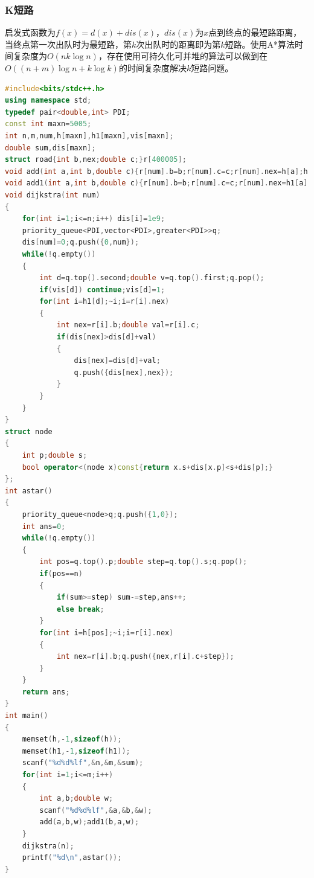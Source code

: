 \documentclass[a4paper]{book}
\begin{document}
\subsubsection{K短路}
启发式函数为$f(x)=d(x)+dis(x)$，$dis(x)$为$x$点到终点的最短路距离，当终点第一次出队时为最短路，第$k$次出队时的距离即为第$k$短路。使用A*算法时间复杂度为$O(nk\log n)$，存在使用可持久化可并堆的算法可以做到在$O((n+m) \log n + k \log k)$的时间复杂度解决$k$短路问题。
\begin{lstlisting}[language=C++]
#include<bits/stdc++.h>
using namespace std;
typedef pair<double,int> PDI;
const int maxn=5005;
int n,m,num,h[maxn],h1[maxn],vis[maxn];
double sum,dis[maxn];
struct road{int b,nex;double c;}r[400005];
void add(int a,int b,double c){r[num].b=b;r[num].c=c;r[num].nex=h[a];h[a]=num++;}
void add1(int a,int b,double c){r[num].b=b;r[num].c=c;r[num].nex=h1[a];h1[a]=num++;}
void dijkstra(int num)
{
    for(int i=1;i<=n;i++) dis[i]=1e9;
    priority_queue<PDI,vector<PDI>,greater<PDI>>q;
    dis[num]=0;q.push({0,num});
    while(!q.empty())
    {
        int d=q.top().second;double v=q.top().first;q.pop();
        if(vis[d]) continue;vis[d]=1;
        for(int i=h1[d];~i;i=r[i].nex)
        {
            int nex=r[i].b;double val=r[i].c;
            if(dis[nex]>dis[d]+val)
            {
                dis[nex]=dis[d]+val;
                q.push({dis[nex],nex});
            }
        }
    }
}
struct node
{
    int p;double s;
    bool operator<(node x)const{return x.s+dis[x.p]<s+dis[p];}
};
int astar()
{
    priority_queue<node>q;q.push({1,0});
    int ans=0;
    while(!q.empty())
    {
        int pos=q.top().p;double step=q.top().s;q.pop();
        if(pos==n)
        {
            if(sum>=step) sum-=step,ans++;
            else break;
        }
        for(int i=h[pos];~i;i=r[i].nex)
        {
            int nex=r[i].b;q.push({nex,r[i].c+step});
        }
    }
    return ans;
}
int main()
{
    memset(h,-1,sizeof(h));
    memset(h1,-1,sizeof(h1));
    scanf("%d%d%lf",&n,&m,&sum);
    for(int i=1;i<=m;i++)
    {
        int a,b;double w;
        scanf("%d%d%lf",&a,&b,&w);
        add(a,b,w);add1(b,a,w);
    }
    dijkstra(n);
    printf("%d\n",astar());
}
\end{lstlisting}
\end{document}
